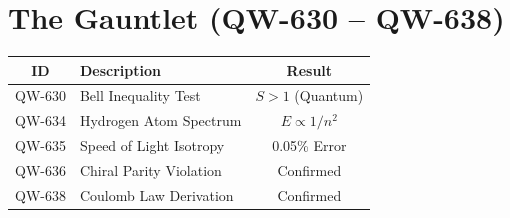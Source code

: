 \documentclass[11pt, a4paper]{report}
\begin{document}
\section*{The Gauntlet (QW-630 -- QW-638)}
\begin{longtable}{|c|p{8cm}|c|}
\hline
\textbf{ID} & \textbf{Description} & \textbf{Result} \\
\hline
QW-630 & Bell Inequality Test & $S > 1$ (Quantum) \\
QW-634 & Hydrogen Atom Spectrum & $E \propto 1/n^2$ \\
QW-635 & Speed of Light Isotropy & 0.05\% Error \\
QW-636 & Chiral Parity Violation & Confirmed \\
QW-638 & Coulomb Law Derivation & Confirmed \\
\hline
\end{longtable}
\end{document}
